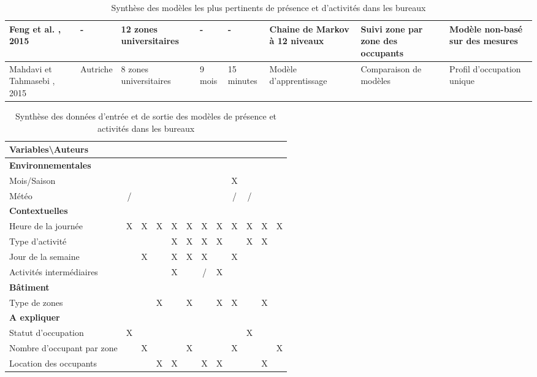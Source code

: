 \begin{landscape}
\begin{table} [H]
\begin{tabular}{|p{2.5cm}|p{2cm}|p{2cm}|p{2cm}|p{2cm}|p{2cm}|p{4cm}|p{4cm}|}
\hline 
Feng et al. \cite{Feng-15}, 2015 & - & 12 zones universitaires & - & - & Chaine de Markov à 12 niveaux  & Suivi zone par zone des occupants & Modèle non-basé sur des mesures \\ 
\hline 
Mahdavi et Tahmasebi \cite{Mahdavi-15}, 2015 & Autriche & 8 zones universitaires & 9 mois & 15 minutes & Modèle d'apprentissage & Comparaison de modèles & Profil d'occupation unique \\ 
\hline 
\end{tabular}
\caption{Synthèse des modèles les plus pertinents de présence et d'activités dans les bureaux}
\label{tab:PresencePresentation}
\end{table}
\end{landscape}

\begin{table} [H]
\centering
\begin{tabular}{|l||c|c|c|c|c|c|c|c|c|c|c|}
\hline
\textbf{Variables\textbackslash Auteurs} & \cite{Wang-05} & \cite{Page-08} & \cite{Erickson-09} & \cite{Tabak-10} & \cite{Davis-10} & \cite{Liao-11} & \cite{Wang-11} & \cite{Duarte-13} & \cite{Chang-14} & \cite{Feng-15} & \cite{Mahdavi-15} \\
\hline
\hline \rowcolor{gray}\textbf{Environnementales} & \multicolumn{11}{c}{} \\
\hline Mois/Saison &  &  &  &  &  &  &  & X &  &  &   \\
\hline Météo & / &  &  &  &  &  &  & / & / &  &   \\
\hline \rowcolor{gray}\textbf{Contextuelles} & \multicolumn{11}{c}{} \\
\hline Heure de la journée & X & X & X & X & X & X & X & X & X & X & X \\
\hline Type d'activité &  &  &  & X & X & X & X &  & X & X &  \\
\hline Jour de la semaine &  & X &  & X & X & X &  & X &  &  &   \\
\hline Activités intermédiaires &  &  &  & X &  & / & X &  &  &  &   \\
\hline \rowcolor{gray}\textbf{Bâtiment} & \multicolumn{11}{c}{} \\
\hline Type de zones &  &  & X &  & X &  & X & X &  & X &   \\
\hline \rowcolor{gray}\textbf{A expliquer} & \multicolumn{11}{c}{} \\
\hline Statut d'occupation & X &  &  &  &  &  &  &  & X &  &   \\
\hline Nombre d'occupant par zone &  & X &  &  & X &  &  & X &  &  & X  \\
\hline Location des occupants &  &  & X & X &  & X & X &  &  & X &   \\
\hline
\end{tabular}
\caption{Synthèse des données d'entrée et de sortie des modèles de présence et activités dans les bureaux}
\label{tab:PresenceOffice} 
\end{table}

